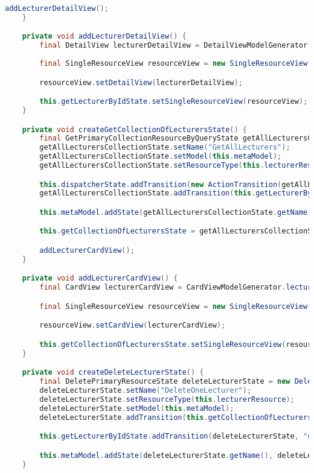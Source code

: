 \begin{lstlisting}[label=lst:enfield_model,
language=java,
firstnumber=1,
caption=Beschreibung des \textit{Enfield-Modell} der Referenzimplementierung. ]
		addLecturerDetailView();
	}

	private void addLecturerDetailView() {
		final DetailView lecturerDetailView = DetailViewModelGenerator.lecturer();
	
		final SingleResourceView resourceView = new SingleResourceView();

		resourceView.setDetailView(lecturerDetailView);

		this.getLecturerByIdState.setSingleResourceView(resourceView);
	}

	private void createGetCollectionOfLecturersState() {
		final GetPrimaryCollectionResourceByQueryState getAllLecturersCollectionState = new GetPrimaryCollectionResourceByQueryState();
		getAllLecturersCollectionState.setName("GetAllLecturers");
		getAllLecturersCollectionState.setModel(this.metaModel);
		getAllLecturersCollectionState.setResourceType(this.lecturerResource);

		this.dispatcherState.addTransition(new ActionTransition(getAllLecturersCollectionState, "getAllLecturers"));
		getAllLecturersCollectionState.addTransition(this.getLecturerByIdState);

		this.metaModel.addState(getAllLecturersCollectionState.getName(), getAllLecturersCollectionState);

		this.getCollectionOfLecturersState = getAllLecturersCollectionState;

		addLecturerCardView();
	}

	private void addLecturerCardView() {
		final CardView lecturerCardView = CardViewModelGenerator.lecturer();

		final SingleResourceView resourceView = new SingleResourceView();

		resourceView.setCardView(lecturerCardView);

		this.getCollectionOfLecturersState.setSingleResourceView(resourceView);
	}

	private void createDeleteLecturerState() {
		final DeletePrimaryResourceState deleteLecturerState = new DeletePrimaryResourceState();
		deleteLecturerState.setName("DeleteOneLecturer");
		deleteLecturerState.setResourceType(this.lecturerResource);
		deleteLecturerState.setModel(this.metaModel);
		deleteLecturerState.addTransition(this.getCollectionOfLecturersState, "getAllLecturers");

		this.getLecturerByIdState.addTransition(deleteLecturerState, "deleteLecturer");

		this.metaModel.addState(deleteLecturerState.getName(), deleteLecturerState);
	}


\end{lstlisting}
